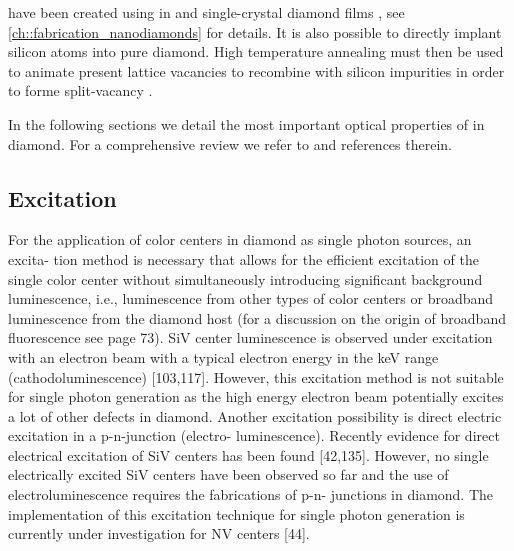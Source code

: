   \sivs have been created using \CVD in \nds and single-crystal diamond films \cite{janine::25}, see \autoref{ch::fabrication_nanodiamonds} for details. It is also possible to directly implant silicon atoms into pure diamond. High temperature annealing must then be used to animate present lattice vacancies to recombine with silicon impurities in order to forme split-vacancy \sivs \cite{janine::24,janine::223}.

  In the following sections we detail the most important optical properties of \sivs in diamond. For a comprehensive review we refer to \cite{janine::thesis, neu::thesis} and references therein.

    \subsection{Excitation}

      For the application of color centers in diamond as single photon sources, an excita- tion method is necessary that allows for the efficient excitation of the single color center without simultaneously introducing significant background luminescence, i.e., luminescence from other types of color centers or broadband luminescence from the diamond host (for a discussion on the origin of broadband fluorescence see page 73).
      SiV center luminescence is observed under excitation with an electron beam with a typical electron energy in the keV range (cathodoluminescence) [103,117]. However, this excitation method is not suitable for single photon generation as the high energy electron beam potentially excites a lot of other defects in diamond. Another excitation possibility is direct electric excitation in a p-n-junction (electro- luminescence). Recently evidence for direct electrical excitation of SiV centers has been found [42,135]. However, no single electrically excited SiV centers have been observed so far and the use of electroluminescence requires the fabrications of p-n- junctions in diamond. The implementation of this excitation technique for single photon generation is currently under investigation for NV centers [44].

